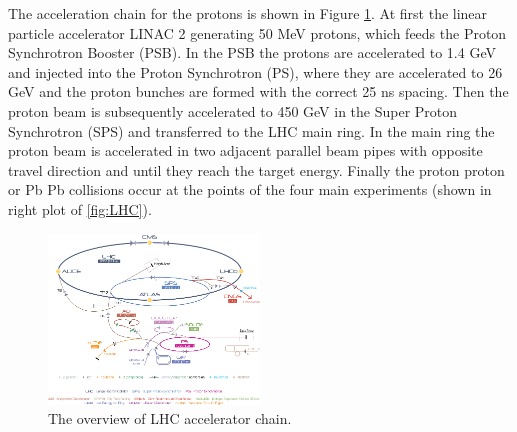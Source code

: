 The acceleration chain for the protons is shown in Figure \ref{fig:LHC_chain}. At first the linear particle accelerator LINAC 2 generating 50 MeV protons, which feeds the Proton Synchrotron Booster (PSB). In the PSB the protons are accelerated to 1.4 GeV and injected into the Proton Synchrotron (PS), where they are accelerated to 26 GeV and the proton bunches are formed with the correct 25 ns spacing. Then the proton beam is subsequently accelerated to 450 GeV in the Super Proton Synchrotron (SPS) and transferred to the LHC main ring. In the main ring the proton beam is accelerated in two adjacent parallel beam pipes with opposite travel direction and until they reach the target energy. Finally the proton proton or Pb Pb collisions occur at the points of the four main experiments (shown in right plot of \ref{fig:LHC}).
\begin{figure}[h!]
\begin{center}
\includegraphics[width=0.5\textwidth]{figures/LHC/lhc_accelerator_chain.png}
\caption{The overview of LHC accelerator chain.}
\label{fig:LHC_chain}
\end{center}
\end{figure}
